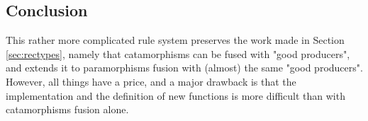\subsection{Conclusion}
This rather more complicated rule system preserves the work made in Section \ref{sec:rectypes}, namely that catamorphisms can be fused with "good producers", and extends it to paramorphisms fusion with (almost) the same "good producers". However, all things have a price, and a major drawback is that the implementation and the definition of new functions is more difficult than with catamorphisms fusion alone.